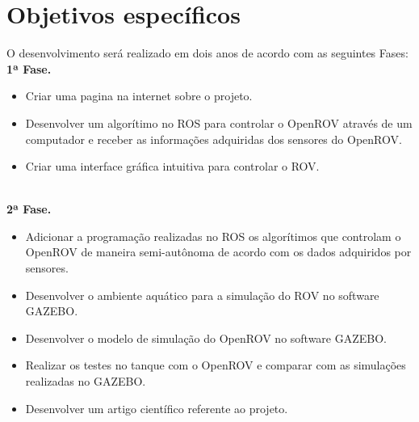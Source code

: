 \section{Objetivos específicos}
O desenvolvimento será realizado em dois anos de acordo com as seguintes Fases:
\textbf{ 1ª Fase.}

\begin{itemize}

	\item Criar uma pagina na internet sobre o projeto.
	\item Desenvolver um algorítimo no ROS para controlar o OpenROV através de um computador e receber as informações adquiridas dos sensores do OpenROV.
	\item Criar uma interface gráfica intuitiva para controlar o ROV.
\end{itemize}\\
\textbf{ 2ª Fase.}


\begin{itemize}

	\item Adicionar a programação realizadas no ROS os algorítimos que controlam o OpenROV de maneira semi-autônoma de acordo com os dados adquiridos por sensores.
    \item Desenvolver o ambiente aquático para a simulação do ROV no software GAZEBO.
	\item Desenvolver o modelo de simulação do OpenROV no software GAZEBO.
	\item Realizar os testes no tanque com o OpenROV e comparar com as simulações realizadas no GAZEBO.
	\item Desenvolver um artigo científico referente ao projeto.

\end{itemize}


